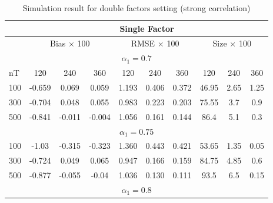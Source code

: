 \begin{table}[]
	\caption{Simulation result for double factors setting (strong correlation)}\label{table:exp4}
	\centering
	\begin{tabular}{lccccccccc}
		\hline
\hline
\multicolumn{1}{l|}{}    & \multicolumn{9}{c}{Single Factor}                                                                                                  \\ \hline
\multicolumn{1}{l|}{}    & \multicolumn{3}{c|}{Bias $\times$ 100}        & \multicolumn{3}{c|}{RMSE $\times$ 100}     & \multicolumn{3}{c}{Size $\times$ 100} \\ \hline
\multicolumn{10}{c}{$\alpha_1 = 0.7$}                                                                                                                         \\ \hline
\multicolumn{1}{l|}{nT}  & 120    & 240    & \multicolumn{1}{c|}{360}    & 120   & 240   & \multicolumn{1}{c|}{360}   & 120         & 240        & 360        \\ \hline
\multicolumn{1}{l|}{100} & -0.659 & 0.069  & \multicolumn{1}{c|}{0.059}  & 1.193 & 0.406 & \multicolumn{1}{c|}{0.372} & 46.95       & 2.65       & 1.25       \\
\multicolumn{1}{l|}{300} & -0.704 & 0.048  & \multicolumn{1}{c|}{0.055}  & 0.983 & 0.223 & \multicolumn{1}{c|}{0.203} & 75.55       & 3.7        & 0.9        \\
\multicolumn{1}{l|}{500} & -0.841 & -0.011 & \multicolumn{1}{c|}{-0.004} & 1.056 & 0.161 & \multicolumn{1}{c|}{0.144} & 86.4        & 5.1        & 0.3        \\ \hline
\multicolumn{10}{c}{$\alpha_1 = 0.75$}                                                                                                                        \\ \hline
\multicolumn{1}{c|}{100} & -1.03  & -0.315 & \multicolumn{1}{c|}{-0.323} & 1.360 & 0.443 & \multicolumn{1}{c|}{0.421} & 53.65       & 1.35       & 0.05       \\
\multicolumn{1}{l|}{300} & -0.724 & 0.049  & \multicolumn{1}{c|}{0.065}  & 0.947 & 0.166 & \multicolumn{1}{c|}{0.159} & 84.75       & 4.85       & 0.6        \\
\multicolumn{1}{l|}{500} & -0.877 & -0.055 & \multicolumn{1}{c|}{-0.04}  & 1.036 & 0.130 & \multicolumn{1}{c|}{0.111} & 93.5        & 6.5        & 0.15       \\ \hline
\multicolumn{10}{c}{$\alpha_1 = 0.8$}                                                                                                                         \\ \hline

\end{tabular}
\end{table}

